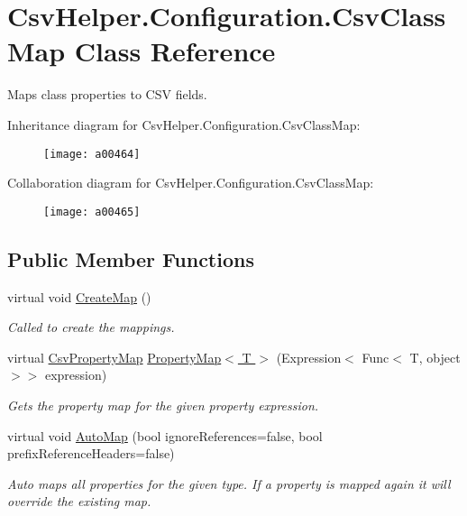 \hypertarget{a00054}{\section{Csv\-Helper.\-Configuration.\-Csv\-Class\-Map Class Reference}
\label{a00054}
}


Maps class properties to C\-S\-V fields.  




Inheritance diagram for Csv\-Helper.\-Configuration.\-Csv\-Class\-Map\-:
\nopagebreak
\begin{figure}[H]
\begin{center}
\leavevmode
\texttt{[image: a00464]}
\end{center}
\end{figure}


Collaboration diagram for Csv\-Helper.\-Configuration.\-Csv\-Class\-Map\-:
\nopagebreak
\begin{figure}[H]
\begin{center}
\leavevmode
\texttt{[image: a00465]}
\end{center}
\end{figure}
\subsection*{Public Member Functions}
\begin{DoxyCompactItemize}
\item 
virtual void \hyperlink{a00054_a83de9d28160d0d3da1e017df554a9481}{Create\-Map} ()
\begin{DoxyCompactList}\small\item\em Called to create the mappings. \end{DoxyCompactList}\item 
virtual \hyperlink{a00064}{Csv\-Property\-Map} \hyperlink{a00054_abab2b5cd5a290fd5d17116430b084420}{Property\-Map$<$ T $>$} (Expression$<$ Func$<$ T, object $>$$>$ expression)
\begin{DoxyCompactList}\small\item\em Gets the property map for the given property expression. \end{DoxyCompactList}\item 
virtual void \hyperlink{a00054_aec2097b09baaaac45171f91592af439d}{Auto\-Map} (bool ignore\-References=false, bool prefix\-Reference\-Headers=false)
\begin{DoxyCompactList}\small\item\em Auto maps all properties for the given type. If a property is mapped again it will override the existing map. \end{DoxyCompactList}\end{DoxyCompactItemize}
